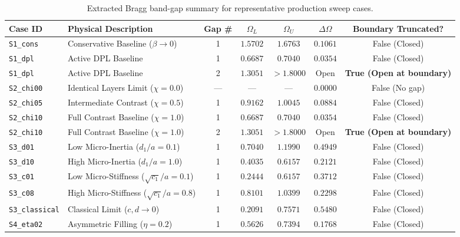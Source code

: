 \documentclass[11pt,a4paper]{article}
\begin{document}
\begin{table}[htbp]
\centering
\caption{Extracted Bragg band-gap summary for representative production sweep cases.}
\label{tab:bandgap_summary}
\small
\begin{tabular*}{\textwidth}{@{\extracolsep{\fill}}llccccc@{}}
\toprule
Case ID & Physical Description & Gap \# & $\Omega_L$ & $\Omega_U$ & $\Delta\Omega$ & Boundary Truncated? \\
\midrule
\texttt{S1\_cons} & Conservative Baseline ($\beta \to 0$) & 1 & $1.5702$ & $1.6763$ & $0.1061$ & False (Closed) \\
\texttt{S1\_dpl} & Active DPL Baseline & 1 & $0.6687$ & $0.7040$ & $0.0354$ & False (Closed) \\
\texttt{S1\_dpl} & Active DPL Baseline & 2 & $1.3051$ & $>1.8000$ & Open & \textbf{True (Open at boundary)} \\
\texttt{S2\_chi00} & Identical Layers Limit ($\chi=0.0$) & --- & --- & --- & $\mathbf{0.0000}$ & False (No gap) \\
\texttt{S2\_chi05} & Intermediate Contrast ($\chi=0.5$) & 1 & $0.9162$ & $1.0045$ & $0.0884$ & False (Closed) \\
\texttt{S2\_chi10} & Full Contrast Baseline ($\chi=1.0$) & 1 & $0.6687$ & $0.7040$ & $0.0354$ & False (Closed) \\
\texttt{S2\_chi10} & Full Contrast Baseline ($\chi=1.0$) & 2 & $1.3051$ & $>1.8000$ & Open & \textbf{True (Open at boundary)} \\
\texttt{S3\_d01} & Low Micro-Inertia ($d_1/a=0.1$) & 1 & $0.7040$ & $1.1990$ & $0.4949$ & False (Closed) \\
\texttt{S3\_d10} & High Micro-Inertia ($d_1/a=1.0$) & 1 & $0.4035$ & $0.6157$ & $0.2121$ & False (Closed) \\
\texttt{S3\_c01} & Low Micro-Stiffness ($\sqrt{c_1}/a=0.1$) & 1 & $0.2444$ & $0.6157$ & $0.3712$ & False (Closed) \\
\texttt{S3\_c08} & High Micro-Stiffness ($\sqrt{c_1}/a=0.8$) & 1 & $0.8101$ & $1.0399$ & $0.2298$ & False (Closed) \\
\texttt{S3\_classical} & Classical Limit ($c, d \to 0$) & 1 & $0.2091$ & $0.7571$ & $0.5480$ & False (Closed) \\
\texttt{S4\_eta02} & Asymmetric Filling ($\eta=0.2$) & 1 & $0.5626$ & $0.7394$ & $0.1768$ & False (Closed) \\
\bottomrule
\end{tabular*}
\end{table}
\end{document}
